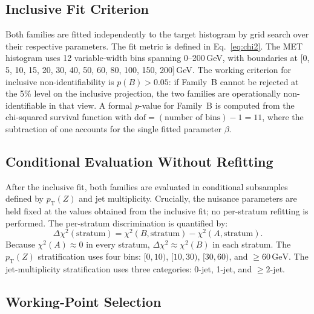 \documentclass[a4paper,11pt]{article}
\newcommand{\pTZ}{\ensuremath{p_{\mathrm{T}}(Z)}\xspace}
\begin{document}
\subsection{Inclusive Fit Criterion}

Both families are fitted independently to the target histogram by grid
search over their respective parameters.
The fit metric is defined in Eq.~\eqref{eq:chi2}.
The MET histogram uses 12 variable-width bins spanning 0--200\,GeV, with
boundaries at [0, 5, 10, 15, 20, 30, 40, 50, 60, 80, 100, 150, 200]\,GeV.
The working criterion for inclusive non-identifiability is $p(B) > 0.05$:
if Family~B cannot be rejected at the 5\% level on the inclusive
projection, the two families are operationally non-identifiable in that
view.
A formal $p$-value for Family~B is computed from the chi-squared survival
function with $\mathrm{dof} = (\text{number of bins}) - 1 = 11$, where the
subtraction of one accounts for the single fitted parameter $\beta$.

\subsection{Conditional Evaluation Without Refitting}

After the inclusive fit, both families are evaluated in conditional
subsamples defined by \pTZ and jet multiplicity.
Crucially, the nuisance parameters are held fixed at the values obtained
from the inclusive fit; no per-stratum refitting is performed.
The per-stratum discrimination is quantified by:
\begin{equation}
  \Delta\chi^2(\text{stratum}) =
    \chi^2(B,\text{stratum}) - \chi^2(A,\text{stratum}).
  \label{eq:deltachi2}
\end{equation}
Because $\chi^2(A) \approx 0$ in every stratum, $\Delta\chi^2 \approx
\chi^2(B)$ in each stratum.
The \pTZ stratification uses four bins: $[0,10)$, $[10,30)$, $[30,60)$,
and $\geq\!60\,\mathrm{GeV}$.
The jet-multiplicity stratification uses three categories: 0-jet, 1-jet,
and $\geq\!2$-jet.

\subsection{Working-Point Selection}
\end{document}
